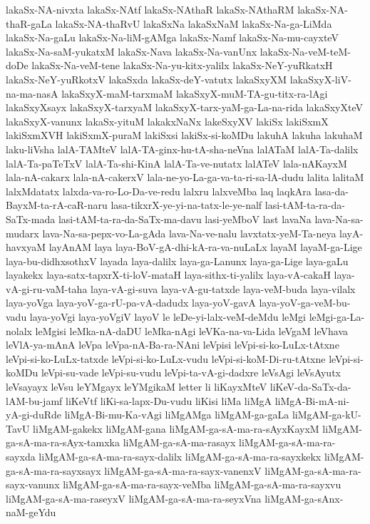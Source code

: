 {lakaSx-NA-nivxta
lakaSx-NAtf
lakaSx-NAthaR
lakaSx-NAthaRM
lakaSx-NA-thaR-gaLa
lakaSx-NA-thaRvU
lakaSxNa
lakaSxNaM
lakaSx-Na-ga-LiMda
lakaSx-Na-gaLu
lakaSx-Na-liM-gAMga
lakaSx-Namf
lakaSx-Na-mu-cayxteV
lakaSx-Na-saM-yukatxM
lakaSx-Nava
lakaSx-Na-vanUnx
lakaSx-Na-veM-teM-doDe
lakaSx-Na-veM-tene
lakaSx-Na-yu-kitx-yalilx
lakaSx-NeY-yuRkatxH
lakaSx-NeY-yuRkotxV
lakaSxda
lakaSx-deY-vatutx
lakaSxyXM
lakaSxyX-liV-na-ma-nasA
lakaSxyX-maM-tarxmaM
lakaSxyX-muM-TA-gu-titx-ra-lAgi
lakaSxyXsayx
lakaSxyX-tarxyaM
lakaSxyX-tarx-yaM-ga-La-na-rida
lakaSxyXteV
lakaSxyX-vanunx
lakaSx-yituM
lakakxNaNx
lakeSxyXV
lakiSx
lakiSxmX
lakiSxmXVH
lakiSxmX-puraM
lakiSxsi
lakiSx-si-koMDu
lakuhA
lakuha
lakuhaM
laku-liVsha
lalA-TAMteV
lalA-TA-ginx-hu-tA-sha-neVna
lalATaM
lalA-Ta-dalilx
lalA-Ta-paTeTxV
lalA-Ta-shi-KinA
lalA-Ta-ve-nutatx
lalATeV
lala-nAKayxM
lala-nA-cakarx
lala-nA-cakerxV
lala-ne-yo-La-ga-va-ta-ri-sa-lA-dudu
lalita
lalitaM
lalxMdatatx
lalxda-va-ro-Lo-Da-ve-redu
lalxru
lalxveMba
laq
laqkAra
lasa-da-BayxM-ta-rA-caR-naru
lasa-tikxrX-ye-yi-na-tatx-le-ye-nalf
lasi-tAM-ta-ra-da-SaTx-mada
lasi-tAM-ta-ra-da-SaTx-ma-davu
lasi-yeMboV
last
lavaNa
lava-Na-sa-mudarx
lava-Na-sa-pepx-vo-La-gAda
lava-Na-ve-nalu
lavxtatx-yeM-Ta-neya
layA-havxyaM
layAnAM
laya
laya-BoV-gA-dhi-kA-ra-va-nuLaLx
layaM
layaM-ga-Lige
laya-bu-didhxsothxV
layada
laya-dalilx
laya-ga-Lanunx
laya-ga-Lige
laya-gaLu
layakekx
laya-satx-tapxrX-ti-loV-mataH
laya-sithx-ti-yalilx
laya-vA-cakaH
laya-vA-gi-ru-vaM-taha
laya-vA-gi-suva
laya-vA-gu-tatxde
laya-veM-buda
laya-vilalx
laya-yoVga
laya-yoV-ga-rU-pa-vA-dadudx
laya-yoV-gavA
laya-yoV-ga-veM-bu-vadu
laya-yoVgi
laya-yoVgiV
layoV
le
leDe-yi-lalx-veM-deMdu
leMgi
leMgi-ga-La-nolalx
leMgisi
leMka-nA-daDU
leMka-nAgi
leVKa-na-va-Lida
leVgaM
leVhava
leVlA-ya-mAnA
leVpa
leVpa-nA-Ba-ra-NAni
leVpisi
leVpi-si-ko-LuLx-tAtxne
leVpi-si-ko-LuLx-tatxde
leVpi-si-ko-LuLx-vudu
leVpi-si-koM-Di-ru-tAtxne
leVpi-si-koMDu
leVpi-su-vade
leVpi-su-vudu
leVpi-ta-vA-gi-dadxre
leVsAgi
leVsAyutx
leVsayayx
leVsu
leYMgayx
leYMgikaM
letter
li
liKayxMteV
liKeV-da-SaTx-da-lAM-bu-jamf
liKeVtf
liKi-sa-lapx-Du-vudu
liKisi
liMa
liMgA
liMgA-Bi-mA-ni-yA-gi-duRde
liMgA-Bi-mu-Ka-vAgi
liMgAMga
liMgAM-ga-gaLa
liMgAM-ga-kU-TavU
liMgAM-gakekx
liMgAM-gana
liMgAM-ga-sA-ma-ra-sAyxKayxM
liMgAM-ga-sA-ma-ra-sAyx-tamxka
liMgAM-ga-sA-ma-rasayx
liMgAM-ga-sA-ma-ra-sayxda
liMgAM-ga-sA-ma-ra-sayx-dalilx
liMgAM-ga-sA-ma-ra-sayxkekx
liMgAM-ga-sA-ma-ra-sayxsayx
liMgAM-ga-sA-ma-ra-sayx-vanenxV
liMgAM-ga-sA-ma-ra-sayx-vanunx
liMgAM-ga-sA-ma-ra-sayx-veMba
liMgAM-ga-sA-ma-ra-sayxvu
liMgAM-ga-sA-ma-raseyxV
liMgAM-ga-sA-ma-ra-seyxVna
liMgAM-ga-sAnx-naM-geYdu
}
